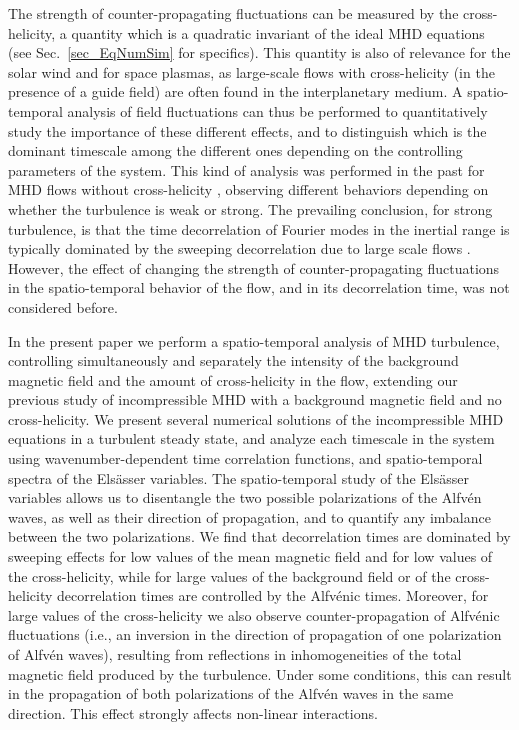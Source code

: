 \documentclass[aip,pop,reprint,amsmath,amssymb,floatfix]{revtex4-1}
\begin{document}
The strength of counter-propagating fluctuations can be measured by
the cross-helicity, a quantity which is a quadratic invariant of the
ideal MHD equations (see Sec.~\ref{sec_EqNumSim} for specifics). This
quantity is also of relevance for the solar wind and for space
plasmas, as large-scale flows with cross-helicity (in the presence of
a guide field) are often found in the interplanetary medium. A
spatio-temporal analysis of field fluctuations
\cite{servidio_time_2011, clark_di_leoni_spatio-temporal_2015} can
thus be performed to quantitatively study the importance of these
different effects, and to distinguish which is the dominant timescale
among the different ones depending on the controlling parameters of
the system. This kind of analysis was performed in the past for MHD
flows without cross-helicity \cite{meyrand_weak_2015,
  lugones_2016_spatiotemporal, meyrand_direct_2016}, observing
different behaviors depending on whether the turbulence is weak or
strong. The prevailing conclusion, for strong turbulence, is that the
time decorrelation of Fourier modes in the inertial range is typically
dominated by the sweeping decorrelation due to large scale flows
\cite{servidio_time_2011, chen_sweeping_1989,
  lugones_2016_spatiotempora}. However, the effect of changing the
strength of counter-propagating fluctuations in the spatio-temporal
behavior of the flow, and in its decorrelation time, was not
considered before.

In the present paper we perform a spatio-temporal analysis of MHD
turbulence, controlling simultaneously and separately the intensity of
the background magnetic field and the amount of cross-helicity in the
flow, extending our previous study \cite{lugones_2016_spatiotemporal}
of incompressible MHD with a background magnetic field and no
cross-helicity. We present several numerical solutions of the
incompressible MHD equations in a turbulent steady state, and analyze
each timescale in the system using wavenumber-dependent time
correlation functions, and spatio-temporal spectra of the Els\"asser
variables. The spatio-temporal study of the Els\"asser variables
allows us to disentangle the two possible polarizations of the
Alfv\'en waves, as well as their direction of propagation, and to
quantify any imbalance between the two polarizations. We find that
decorrelation times are dominated by sweeping effects for low values
of the mean magnetic field and for low values of the cross-helicity,
while for large values of the background field or of the
cross-helicity decorrelation times are controlled by the Alfv\'enic
times. Moreover, for large values of the cross-helicity we also
observe counter-propagation of Alfv\'enic fluctuations (i.e., an
inversion in the direction of propagation of one polarization of
Alfv\'en waves), resulting from reflections in inhomogeneities of the
total magnetic field produced by the turbulence. Under some
conditions, this can result in the propagation of both polarizations
of the Alfv\'en waves in the same direction. This effect strongly
affects non-linear interactions.
\end{document}
